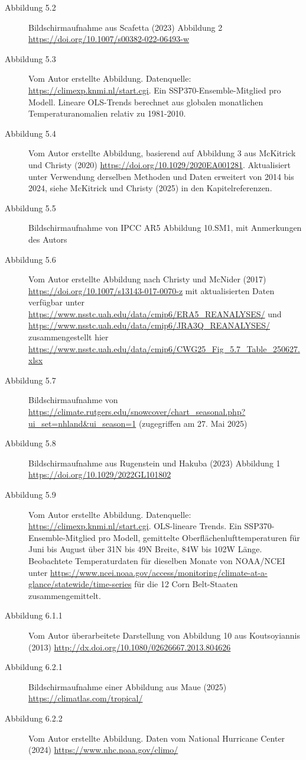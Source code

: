 \documentclass[12pt,paper=a4,DIV=12,parskip=never,chapterprefix=false,headings=standardclasses]{scrreprt}
\begin{document}
\begin{description}
\item[Abbildung 5.2] Bildschirmaufnahme aus Scafetta (2023) Abbildung 2 \url{https://doi.org/10.1007/s00382-022-06493-w}
\item[Abbildung 5.3] Vom Autor erstellte Abbildung. Datenquelle: \url{https://climexp.knmi.nl/start.cgi}. Ein SSP370-Ensemble-Mitglied pro Modell. Lineare OLS-Trends berechnet aus globalen monatlichen Temperaturanomalien relativ zu 1981-2010.
\item[Abbildung 5.4] Vom Autor erstellte Abbildung, basierend auf Abbildung 3 aus McKitrick und Christy (2020) \url{https://doi.org/10.1029/2020EA001281}. Aktualisiert unter Verwendung derselben Methoden und Daten erweitert von 2014 bis 2024, siehe McKitrick und Christy (2025) in den Kapitelreferenzen.
\item[Abbildung 5.5] Bildschirmaufnahme von IPCC AR5 Abbildung 10.SM1, mit Anmerkungen des Autors
\item[Abbildung 5.6] Vom Autor erstellte Abbildung nach Christy und McNider (2017) \url{https://doi.org/10.1007/s13143-017-0070-z} mit aktualisierten Daten verfügbar unter \url{https://www.nsstc.uah.edu/data/cmip6/ERA5_REANALYSES/} und \url{https://www.nsstc.uah.edu/data/cmip6/JRA3Q_REANALYSES/} zusammengestellt hier \url{https://www.nsstc.uah.edu/data/cmip6/CWG25_Fig_5.7_Table_250627.xlsx}
\item[Abbildung 5.7] Bildschirmaufnahme von \url{https://climate.rutgers.edu/snowcover/chart_seasonal.php?ui_set=nhland&ui_season=1} (zugegriffen am 27. Mai 2025)
\item[Abbildung 5.8] Bildschirmaufnahme aus Rugenstein und Hakuba (2023) Abbildung 1 \url{https://doi.org/10.1029/2022GL101802}
\item[Abbildung 5.9] Vom Autor erstellte Abbildung. Datenquelle: \url{https://climexp.knmi.nl/start.cgi}. OLS-lineare Trends. Ein SSP370-Ensemble-Mitglied pro Modell, gemittelte Oberflächenlufttemperaturen für Juni bis August über 31N bis 49N Breite, 84W bis 102W Länge. Beobachtete Temperaturdaten für dieselben Monate von NOAA/NCEI unter \url{https://www.ncei.noaa.gov/access/monitoring/climate-at-a-glance/statewide/time-series} für die 12 Corn Belt-Staaten zusammengemittelt.
\item[Abbildung 6.1.1] Vom Autor überarbeitete Darstellung von Abbildung 10 aus Koutsoyiannis (2013) \url{http://dx.doi.org/10.1080/02626667.2013.804626}
\item[Abbildung 6.2.1] Bildschirmaufnahme einer Abbildung aus Maue (2025) \url{https://climatlas.com/tropical/}
\item[Abbildung 6.2.2] Vom Autor erstellte Abbildung. Daten vom National Hurricane Center (2024) \url{https://www.nhc.noaa.gov/climo/}

\end{description}
\end{document}
